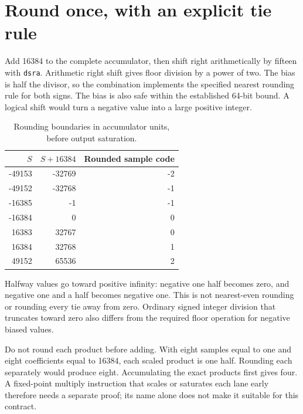 \section{Round once, with an explicit tie rule}
Add 16384 to the complete accumulator, then shift right arithmetically by fifteen
with \texttt{dsra}. Arithmetic right shift gives floor division by a power of two.
The bias is half the divisor, so the combination implements the specified nearest
rounding rule for both signs. The bias is also safe within the established 64-bit
bound. A logical shift would turn a negative value into a large positive integer.

\begin{table}[htbp]
  \centering
  \caption{Rounding boundaries in accumulator units, before output saturation.}
  \begin{tabular}{rrr}
    \toprule
    \(S\)  & \(S+16384\) & Rounded sample code \\
    \midrule
    -49153 & -32769      & -2                  \\
    -49152 & -32768      & -1                  \\
    -16385 & -1          & -1                  \\
    -16384 & 0           & 0                   \\
    16383  & 32767       & 0                   \\
    16384  & 32768       & 1                   \\
    49152  & 65536       & 2                   \\
    \bottomrule
  \end{tabular}
\end{table}

Halfway values go toward positive infinity: negative one half becomes zero, and
negative one and a half becomes negative one. This is not nearest-even rounding or
rounding every tie away from zero. Ordinary signed integer division that truncates
toward zero also differs from the required floor operation for negative biased values.

Do not round each product before adding. With eight samples equal to one and eight
coefficients equal to 16384, each scaled product is one half. Rounding each separately
would produce eight. Accumulating the exact products first gives four. A fixed-point
multiply instruction that scales or saturates each lane early therefore needs a separate
proof; its name alone does not make it suitable for this contract.
